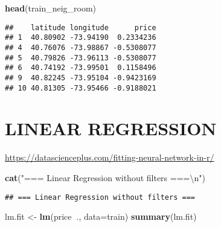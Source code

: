 \documentclass[
]{article}
\newenvironment{Shaded}{\begin{snugshade}}{\end{snugshade}}
\newcommand{\CharTok}[1]{\textcolor[rgb]{0.31,0.60,0.02}{#1}}
\newcommand{\DataTypeTok}[1]{\textcolor[rgb]{0.13,0.29,0.53}{#1}}
\newcommand{\KeywordTok}[1]{\textcolor[rgb]{0.13,0.29,0.53}{\textbf{#1}}}
\newcommand{\NormalTok}[1]{#1}
\newcommand{\OperatorTok}[1]{\textcolor[rgb]{0.81,0.36,0.00}{\textbf{#1}}}
\newcommand{\StringTok}[1]{\textcolor[rgb]{0.31,0.60,0.02}{#1}}
\begin{document}
\begin{Shaded}
\begin{Highlighting}[]
\KeywordTok{head}\NormalTok{(train_neig_room)}
\end{Highlighting}
\end{Shaded}

\begin{verbatim}
##    latitude longitude      price
## 1  40.80902 -73.94190  0.2334236
## 4  40.76076 -73.98867 -0.5308077
## 5  40.79826 -73.96113 -0.5308077
## 6  40.74192 -73.99501  0.1158496
## 9  40.82245 -73.95104 -0.9423169
## 10 40.81305 -73.95466 -0.9188021
\end{verbatim}

\hypertarget{linear-regression}{%
\section{LINEAR REGRESSION}\label{linear-regression}}

\url{https://datascienceplus.com/fitting-neural-network-in-r/}

\begin{Shaded}
\begin{Highlighting}[]
\KeywordTok{cat}\NormalTok{(}\StringTok{"=== Linear Regression without filters ===}\CharTok{\textbackslash{}n}\StringTok{"}\NormalTok{)}
\end{Highlighting}
\end{Shaded}

\begin{verbatim}
## === Linear Regression without filters ===
\end{verbatim}

\begin{Shaded}
\begin{Highlighting}[]
\NormalTok{lm.fit <-}\StringTok{ }\KeywordTok{lm}\NormalTok{(price}\OperatorTok{~}\NormalTok{., }\DataTypeTok{data=}\NormalTok{train)}
\KeywordTok{summary}\NormalTok{(lm.fit)}
\end{Highlighting}
\end{Shaded}
\end{document}

